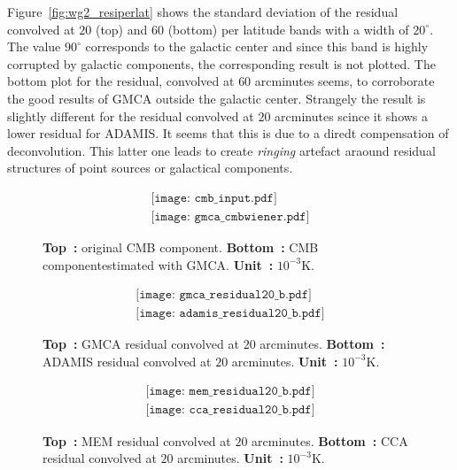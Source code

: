 Figure~\ref{fig:wg2_resiperlat} shows the standard deviation of the residual convolved at $20$ (top) and $60$ (bottom) per latitude bands with a width of $20^\circ$. The value $90^\circ$ corresponds 
to the galactic center and since this band is highly corrupted by galactic components, the corresponding result is not plotted. The bottom plot for the residual, convolved at $60$ arcminutes seems, to 
corroborate the good results of GMCA outside the galactic center. Strangely the result is slightly different for the residual convolved at $20$ arcminutes scince it shows a lower residual for ADAMIS. 
It seems that this is due to a diredt compensation of deconvolution. This latter one leads to create \textit{ringing} artefact araound residual structures of point sources or galactical components.

\begin{center}
\begin{figure}[htb]
$$
\begin{array}{cc}
\texttt{[image: cmb\_input.pdf]} \\
\texttt{[image: gmca\_cmbwiener.pdf]}
\end{array}
$$
\vspace{-0.1in} \caption{\textbf{Top~:} original CMB component. \textbf{Bottom~:} CMB componentestimated with GMCA. \textbf{Unit~:}  $10^{-3}$K.} \label{fig:wg2_maps}
\end{figure}
\end{center}

\begin{center}
\begin{figure}[htb]
$$
\begin{array}{cc}
\texttt{[image: gmca\_residual20\_b.pdf]} \\
\texttt{[image: adamis\_residual20\_b.pdf]} 
\end{array}
$$
\vspace{-0.1in}\caption{\textbf{Top~:} GMCA residual convolved at $20$ arcminutes. \textbf{Bottom~:} ADAMIS residual convolved at $20$ arcminutes. \textbf{Unit~:}  $10^{-3}$K.} \label{fig:wg2_resi20}
\end{figure}
\end{center}

\begin{center}
\begin{figure}[htb]
$$
\begin{array}{cc}
\texttt{[image: mem\_residual20\_b.pdf]} \\
\texttt{[image: cca\_residual20\_b.pdf]}
\end{array}
$$
\vspace{-0.1in} \caption{\textbf{Top~:} MEM residual convolved at $20$ arcminutes. \textbf{Bottom~:} CCA residual convolved at $20$ arcminutes. \textbf{Unit~:}  $10^{-3}$K.} \label{fig:wg2_resi20_2}
\end{figure}
\end{center}

